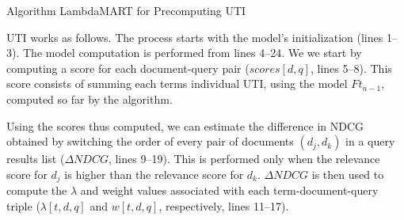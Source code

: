 \documentclass[preprint,review,10pt,3p]{elsarticle}
\begin{document}
\begin{algorithm}[ht!]
\caption{Algorithm LambdaMART for Precomputing UTI }
\label{alg:utilambda}
\SetAlgoLined
{}
\end{algorithm}\DecMargin{1em}


UTI \lambdamart works as follows.
The process starts with the model's initialization (lines 1--3). The model computation is performed from lines 4--24. We we start by computing a score for each document-query pair ($scores[d,q]$, lines 5--8). 
This score consists of summing each terms individual UTI, using the model $Ft_{n-1}$, computed so far by the algorithm. 

Using the scores thus computed, we can estimate the difference in NDCG obtained by switching the order of every pair of documents $(d_j,d_k)$ in a query results list ($\Delta NDCG$, lines 9--19). This is performed only when the relevance score for $d_j$ is higher than the relevance score for $d_k$. $\Delta NDCG$ is then used  to compute the $\lambda$ and weight values associated with each term-document-query triple ($\lambda[t,d,q]$ and $w[t,d,q]$, respectively, lines 11--17).
\end{document}
